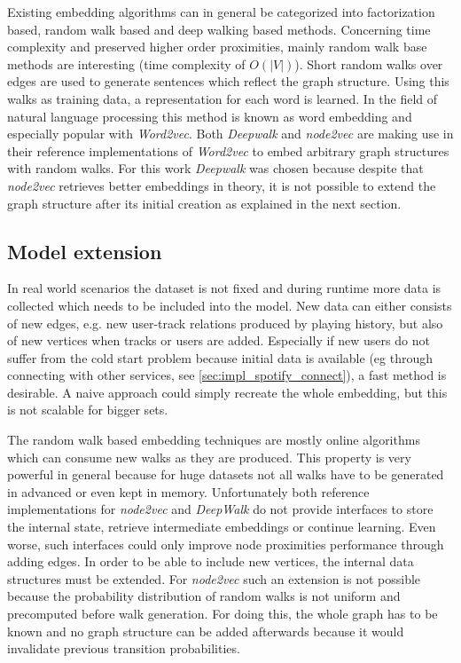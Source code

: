 \documentclass[sigconf]{acmart}
\begin{document}
Existing embedding algorithms can in general be categorized into factorization based, random walk based and deep walking based methods. Concerning time complexity and preserved higher order proximities, mainly random walk base methods are interesting (time complexity of $ O(|V|) $). Short random walks over edges are used to generate sentences which reflect the graph structure. Using this walks as training data, a representation for each word is learned. In the field of natural language processing this method is known as word embedding and especially popular with \emph{Word2vec}\cite{mikolov2013efficient}. Both \emph{Deepwalk}\cite{perozzi2014deepwalk} and \emph{node2vec}\cite{grover2016node2vec} are making use in their reference implementations of \emph{Word2vec} to embed arbitrary graph structures with random walks. For this work \emph{Deepwalk} was chosen because despite that \emph{node2vec} retrieves better embeddings in theory, it is not possible to extend the graph structure after its initial creation as explained in the next section.

\subsection{Model extension}
In real world scenarios the dataset is not fixed and during runtime more data is collected which needs to be included into the model. New data can either consists of new edges, e.g. new user-track relations produced by playing history, but also of new vertices when tracks or users are added. Especially if new users do not suffer from the cold start problem because initial data is available (eg through connecting with other services, see \ref{sec:impl_spotify_connect}), a fast method is desirable. A naive approach could simply recreate the whole embedding, but this is not scalable for bigger sets. 

The random walk based embedding techniques are mostly online algorithms which can consume new walks as they are produced. This property is very powerful in general because for huge datasets not all walks have to be generated in advanced or even kept in memory. Unfortunately both reference implementations for \emph{node2vec} and \emph{DeepWalk} do not provide interfaces to store the internal state, retrieve intermediate embeddings or continue learning. Even worse, such interfaces could only improve node proximities performance through adding edges. In order to be able to include new vertices, the internal data structures must be extended. For \emph{node2vec} such an extension is not possible because the probability distribution of random walks is not uniform and precomputed before walk generation. For doing this, the whole graph has to be known and no graph structure can be added afterwards because it would invalidate previous transition probabilities.
\end{document}
